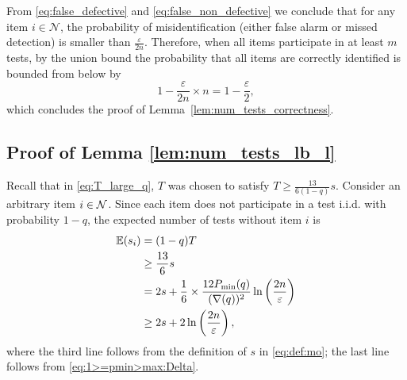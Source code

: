 \documentclass[onecolumn,letterpaper]{IEEEtran}
\newcommand{\cN}{{\cal N}}
\newcommand{\cp}{{q}}
\newcommand{\nt}{{m}}
\newcommand{\mo}{{s}}
\newcommand{\moi}{{\mo_{i}}}
\newcommand{\pmin}{{P_{\min}(\cp)}}
\newcommand{\Tl}{{\hat{T}}}
\newcommand{\pgapm}{{\nabla(\cp)}}
\begin{document}
From \eqref{eq:false_defective} and \eqref{eq:false_non_defective} we conclude that for any item $i\in\mathcal{N}$, the probability of  misidentification (either false alarm or missed detection) is smaller than $\frac{\varepsilon}{2n}$. Therefore, when all items participate in at least $\nt$ tests, by the union bound the probability that all items are correctly identified is bounded from below by
\begin{equation}
    1 - \frac{\varepsilon}{2n} \times n = 1 - \frac{\varepsilon}{2},
\end{equation}
which concludes the proof of Lemma~\ref{lem:num_tests_correctness}.%

\subsection{Proof of Lemma \ref{lem:num_tests_lb_l}} \label{sec:num_tests_lb_l}
Recall that in \eqref{eq:T_large_q}, $T$ was chosen to satisfy $T \ge \frac{13}{6(1-\cp)} \mo$. 
Consider an arbitrary item $i\in \cN$. 
Since each item does not participate in a test i.i.d. with probability $1-\cp$,  
the expected number of tests without item $i$ is
\begin{align}
    \mathbb{E}(\moi) &= (1-\cp) T \notag \\ 
    &\ge \frac{13}{6} \mo \notag \\ 
    &= 2\mo + \frac{1}{6} \times \frac{12\pmin}{(\pgapm)^2} \ln \left( \frac{2n}{\varepsilon} \right) \notag\\
    &\ge 2\mo + 2\ln \left( \frac{2n}{\varepsilon} \right), \label{eq:l:ETi_4}
\end{align}
where the third line follows from the definition of $\mo$ in \eqref{eq:def:mo}; the last line follows from \eqref{eq:1>=pmin>max:Delta}.
\end{document}
